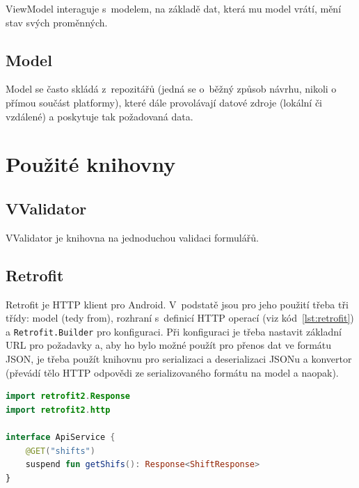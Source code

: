 \documentclass[twoside]{ctuthesis}
\begin{document}
ViewModel interaguje s~modelem, na základě dat, která mu model vrátí, mění stav svých proměnných.

\subsection{Model}

Model se často skládá z~repozitářů (jedná se o~běžný způsob návrhu, nikoli o přímou součást platformy), které dále provolávají datové zdroje (lokální či vzdálené) a poskytuje tak požadovaná data.

\newpage
\section{Použité knihovny}

\subsection{VValidator}
VValidator \cite{follestad2021vvalidator} je knihovna na jednoduchou validaci formulářů.

\subsection{Retrofit}
Retrofit je HTTP klient pro Android. V~podstatě jsou pro jeho použití třeba tři třídy: model (tedy from), rozhraní s~definicí HTTP operací (viz kód~\ref{lst:retrofit}) a \texttt{Retrofit.Builder} pro konfiguraci. Při konfiguraci je třeba nastavit základní URL pro požadavky a, aby ho bylo možné použít pro přenos dat ve formátu JSON, je třeba použít knihovnu pro serializaci a deserializaci JSONu a konvertor (převádí tělo HTTP odpovědi ze serializovaného formátu na model a naopak). \cite{kantamani2019understand}

\begin{lstlisting}[language=Kotlin,caption={Definice HTTP operací pro Retrofit},label={lst:retrofit}]
import retrofit2.Response
import retrofit2.http

interface ApiService {
    @GET("shifts")
    suspend fun getShifs(): Response<ShiftResponse>
}
\end{lstlisting}
\end{document}
